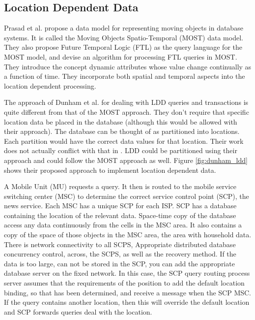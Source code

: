 \documentclass[12pt,a4paper]{article}
\begin{document}
\subsection{Location Dependent Data} %
\label{sub:location_dependent_data_c}
Prasad et al. propose a data model for representing moving objects in database systems. It is called the Moving Objects Spatio-Temporal (MOST) data model. They also propose Future Temporal Logic (FTL) as the query language for the MOST model, and devise an algorithm for processing FTL queries in MOST. \cite{prasad1997modeling} They introduce the concept dynamic attributes whose value change continually as a function of time. They incorporate both spatial and temporal aspects into the location dependent processing.

The approach of Dunham et al. for dealing with LDD queries and transactions is quite different from that of the MOST approach. They don't require that specific location data be  placed in the database (although this would be allowed with their approach). The database can be thought of as partitioned into locations. Each partition would have the correct data values for that location. Their work does not actually conflict with that in \cite{prasad1997modeling}. LDD could be partitioned using their approach and could follow the MOST approach as well. \cite{Dunham:1998ci} Figure \ref{fig:dunham_ldd} shows their proposed approach to implement location dependent data. 

A Mobile Unit (MU) requests a query. It then is routed to the mobile service switching center (MSC) to determine the correct service control point (SCP), the news service. Each MSC has a unique SCP for each ISP. SCP has a database containing the location of the relevant data. Space-time copy of the database access any data continuously from the cells in the MSC area. It also contains a copy of the space of those objects in the MSC area, the area with household data. There is network connectivity to all SCPS, Appropriate distributed database concurrency control, across, the SCPS, as well as the recovery method. If the data is too large, can not be stored in the SCP, you can add the appropriate database server on the fixed network. In this case, the SCP query routing process server assumes that the requirements of the position to add the default location binding, so that has been determined, and receive a message when the SCP MSC. If the query contains another location, then this will override the default location and SCP forwards queries deal with the location. \cite{Dunham:1998ci}
\end{document}
